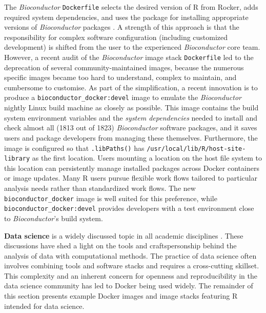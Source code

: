 The \emph{Bioconductor} \texttt{Dockerfile} selects the desired version
of R from Rocker, adds required system dependencies, and uses the
 package for installing appropriate versions of
\emph{Bioconductor} packages \citep{cran_biocmanager}. A strength of
this approach is that the responsibility for complex software
configuration (including customized development) is shifted from the
user to the experienced \emph{Bioconductor} core team. However, a recent
audit of the \emph{Bioconductor} image stack \texttt{Dockerfile} led to
the deprecation of several community-maintained images, because the
numerous specific images became too hard to understand, complex to
maintain, and cumbersome to customise. As part of the simplification, a
recent innovation is to produce a \texttt{bioconductor\_docker:devel}
image to emulate the \emph{Bioconductor} nightly Linux build machine as
closely as possible. This image contains the build system environment
variables and the \emph{system dependencies} needed to install and check
almost all (1813 out of 1823) \emph{Bioconductor} software packages, and
it saves users and package developers from managing these themselves.
Furthermore, the image is configured so that \texttt{.libPaths()} has
\texttt{/usr/local/lib/R/host-site-library} as the first location. Users
mounting a location on the host file system to this location can
persistently manage installed packages across Docker containers or image
updates. Many R users pursue flexible work flows tailored to particular
analysis needs rather than standardized work flows. The new
\texttt{bioconductor\_docker} image is well suited for this preference,
while \texttt{bioconductor\_docker:devel} provides developers with a
test environment close to \emph{Bioconductor}'s build system.

\label{datascience} \textbf{Data science} is a widely discussed topic in
all academic disciplines \citep[e.g.,][]{donoho_50_2017}. These
discussions have shed a light on the tools and craftspersonship behind
the analysis of data with computational methods. The practice of data
science often involves combining tools and software stacks and requires
a cross-cutting skillset. This complexity and an inherent concern for
openness and reproducibility in the data science community has led to
Docker being used widely. The remainder of this section presents example
Docker images and image stacks featuring R intended for data science.

